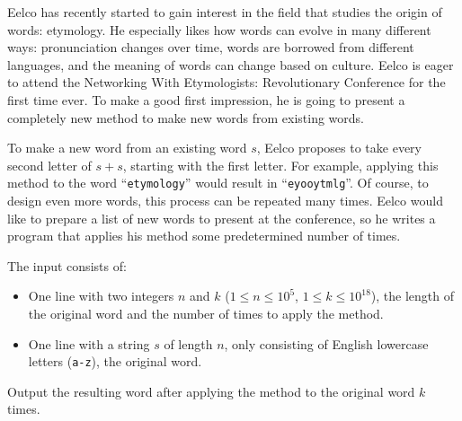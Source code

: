 \problemname{}


\newcommand{\protagonist}{Eelco}

\protagonist{} has recently started to gain interest in the field that studies the origin of words: etymology.
He especially likes how words can evolve in many different ways:
pronunciation changes over time,
words are borrowed from different languages,
and the meaning of words can change based on culture.
\protagonist{} is eager to attend the Networking With Etymologists: Revolutionary Conference for the first time ever.
To make a good first impression,
he is going to present a completely new method to make new words from existing words.

To make a new word from an existing word $s$,
\protagonist{} proposes to take every second letter of $s+s$,
starting with the first letter.
For example, applying this method to the word ``\texttt{etymology}'' would result in ``\texttt{eyooytmlg}''.
Of course, to design even more words, this process can be repeated many times.
\protagonist{} would like to prepare a list of new words to present at the conference,
so he writes a program that applies his method some predetermined number of times.

\begin{Input}
    The input consists of:
    \begin{itemize}
        \item One line with two integers $n$ and $k$ ($1 \leq n \leq 10^5$, $1 \leq k \leq 10^{18}$),
            the length of the original word and the number of times to apply the method.
        \item One line with a string $s$ of length $n$, only consisting of English lowercase letters (\texttt{a-z}),
            the original word.
    \end{itemize}
\end{Input}

\begin{Output}
    Output the resulting word after applying the method to the original word $k$ times.
\end{Output}
